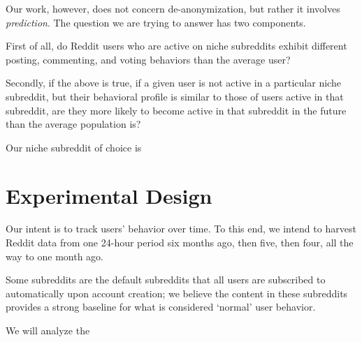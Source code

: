 \documentclass[10pt]{article}
\begin{document}
Our work, however, does not concern de-anonymization, but rather it involves \textit{prediction}. The question we are trying to answer has two components.

First of all, do Reddit users who are active on niche subreddits exhibit different posting, commenting, and voting behaviors than the average user?

Secondly, if the above is true, if a given user is not active in a particular niche subreddit, but their behavioral profile is similar to those of users active in that subreddit, are they more likely to become active in that subreddit in the future than the average population is?

Our niche subreddit of choice is 

\section{Experimental Design}

Our intent is to track users' behavior over time. To this end, we intend to harvest Reddit data from one 24-hour period six months ago, then five, then four, all the way to one month ago.

Some subreddits are the default subreddits that all users are subscribed to automatically upon account creation; we believe the content in these subreddits provides a strong baseline for what is considered `normal' user behavior.

We will analyze the 



\end{document}
